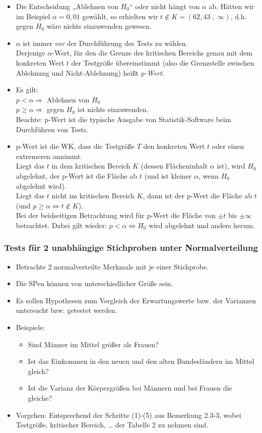 \begin{itemize}
\item Die Entscheidung „Ablehnen von $H_0$“ oder nicht hängt von $\alpha$ ab. Hätten wir im Beispiel $\alpha = 0,01$ gewählt, so erhielten wir $t \not \in K = (62,43 \;,\; \infty)$, d.h. gegen $H_0$ wäre nichts einzuwenden gewesen.
\item $\alpha$ ist immer \emph{vor} der Durchführung des Tests zu wählen.\\
Derjenige $\alpha$-Wert, für den die Grenze des kritischen Bereichs genau mit dem konkreten Wert $t$ der Testgröße übereinstimmt (also die Grenzstelle zwischen Ablehnung und Nicht-Ablehnung) heißt \emph{p-Wert}.
\item Es gilt:\\
$p < \alpha \Rightarrow$ Ablehnen von $H_0$\\
$p \geq \alpha \Rightarrow$ gegen $H_0$ ist nichts einzuwenden.\\
Beachte: p-Wert ist die typische Ausgabe von Statistik-Software beim Durchführen von Tests.
\item p-Wert ist die WK, dass die Testgröße $T$ den konkreten Wert $t$ oder einen extremeren annimmt.\\
Liegt das $t$ in dem kritischen Bereich $K$ (dessen Flächeninhalt $\alpha$ ist), wird $H_0$ abgelehnt, der p-Wert ist die Fläche ab $t$ (und ist kleiner $\alpha$, wenn $H_0$ abgelehnt wird).\\
Liegt das $t$ nicht im kritischen Bereich $K$, dann ist der p-Wert die Fläche ab $t$ (und $p\geq \alpha \Leftrightarrow t \not \in K$).\\
Bei der beidseitigen Betrachtung wird für p-Wert die Fläche von $\pm t$ bis $\pm \infty$ betrachtet. Dabei gilt wieder: $p< \alpha \Leftrightarrow H_0$ wird abgelehnt und anders herum.
\end{itemize}

\subsubsection{Tests für 2 unabhängige Stichproben unter Normalverteilung}
\begin{itemize}
\item Betrachte 2 normalverteilte Merkmale mit je einer Stichprobe.
\item Die SPen können von unterschiedlicher Größe sein.
\item Es sollen Hypothesen zum Vergleich der Erwartungswerte bzw. der Varianzen untersucht bzw. getestet werden.
\item Beispiele:
\begin{itemize}
\item Sind Männer im Mittel größer als Frauen?
\item Ist das Einkommen in den neuen und den alten Bundesländern im Mittel gleich?
\item Ist die Varianz der Körpergrößen bei Männern und bei Frauen die gleiche?
\end{itemize}
\item Vorgehen: Entsprechend der Schritte (1)-(5) aus Bemerkung 2.3-3, wobei Testgröße, kritischer Bereich, … der Tabelle 2 zu nehmen sind. 
\end{itemize}

